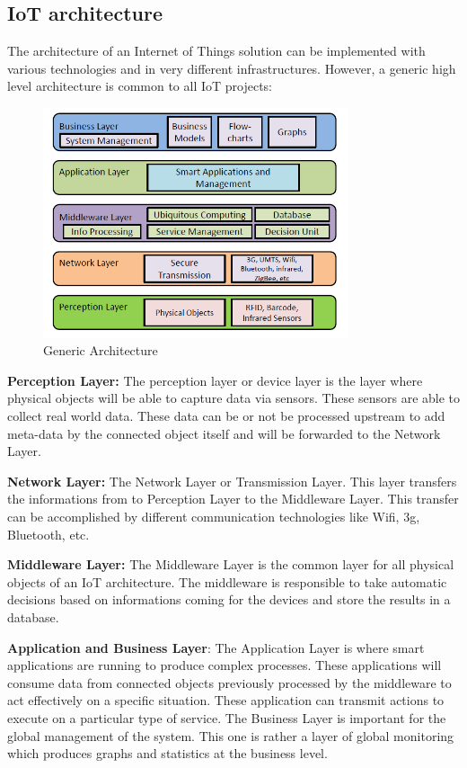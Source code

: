 \documentclass[11pt]{article}
\begin{document}
\subsection{IoT architecture}

The architecture of an Internet of Things solution can be implemented with various technologies and in very different infrastructures. However, a generic high level architecture is common to all IoT projects:
\begin{figure}[h]
	\includegraphics[width=0.8\textwidth]{assets/Abstract_IoT_Architecture.png} 
	\caption{Generic Architecture}
	\label{fig:genericArchitecture}
\end{figure}

\textbf{Perception Layer:} The perception layer or device layer is the layer where physical objects will be able to capture data via sensors. These sensors are able to collect real world data. These data can be or not be processed upstream to add meta-data by the connected object itself and will be forwarded to the Network Layer.

\textbf{Network Layer:} The Network Layer or Transmission Layer. This layer transfers the informations from to Perception Layer to the Middleware Layer. This transfer can be accomplished by different communication technologies like Wifi, 3g, Bluetooth, etc.

\textbf{Middleware Layer:} The Middleware Layer is the common layer for all physical objects of an IoT architecture. The middleware is responsible to take automatic decisions based on informations coming for the devices and store the results in a database. 

\textbf{Application and Business Layer}: The Application Layer is where smart applications are running to produce complex processes. These applications will consume data from connected objects previously processed by the middleware to act effectively on a specific situation. These application can transmit actions to execute on a particular type of service. The Business Layer is important for the global management of the system. This one is rather a layer of global monitoring which produces graphs and statistics at the business level.
\end{document}
